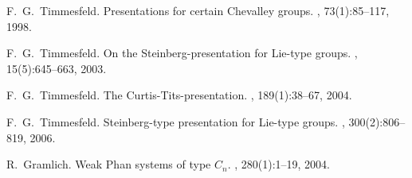 \documentclass[12pt]{amsart}
\theoremstyle{definition}
\begin{document}
\begin{thebibliography}{10}


F.~G.~Timmesfeld.
\newblock Presentations for certain {C}hevalley groups.
, 73(1):85--117, 1998.

F.~G.~Timmesfeld.
\newblock On the {S}teinberg-presentation for {L}ie-type groups.
, 15(5):645--663, 2003.

F.~G.~Timmesfeld.
\newblock The {C}urtis-{T}its-presentation.
, 189(1):38--67, 2004.

F.~G.~Timmesfeld.
\newblock Steinberg-type presentation for {L}ie-type groups.
, 300(2):806--819, 2006.

%
%
%
%






R.~Gramlich.
\newblock Weak {P}han systems of type {$C_n$}.
, 280(1):1--19, 2004.
%


\end{thebibliography}
\end{document}
